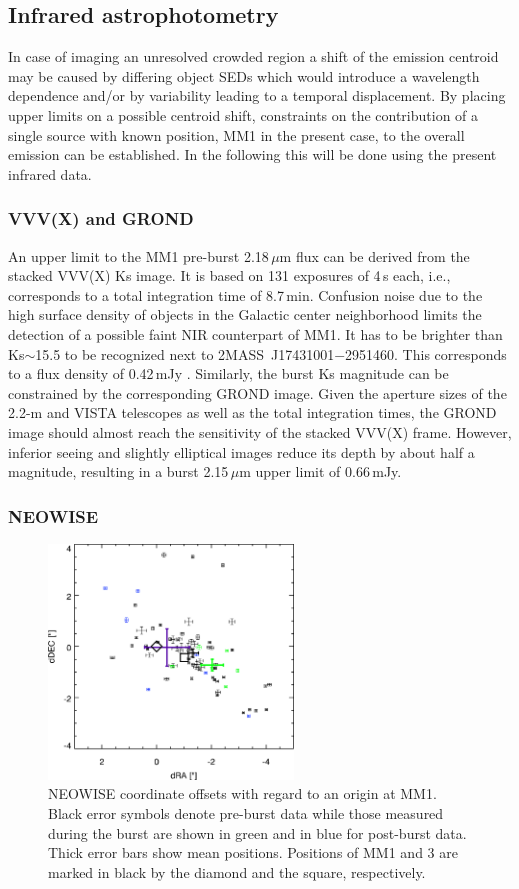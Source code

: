 \documentclass[longauth,usenatbib]{aa}
\begin{document}
\subsection{Infrared astrophotometry}\label{iras}
In case of imaging an unresolved crowded region a shift of the emission centroid may be caused by differing object SEDs which would introduce a wavelength dependence and/or by variability leading to a temporal displacement. By placing upper limits on a possible centroid shift, constraints on the contribution of a single source with known position, MM1 in the present case, to the overall emission can be established. In the following this will be done using %
the present infrared data.

\subsubsection{VVV(X) and GROND}\label{vg}
An upper limit to the MM1 pre-burst 2.18\,$\mu$m flux can be derived from the stacked VVV(X) Ks image. It is based on 131 exposures of 4\,s each, i.e., corresponds to a total integration time of 8.7\,min. Confusion noise due to the high surface density of objects in the Galactic center neighborhood limits the detection of a possible faint NIR counterpart of MM1. It has to be brighter than Ks$\sim$15.5 to be recognized next to 2MASS~J17431001$-$2951460. This corresponds to a flux density of 0.42\,mJy . Similarly, the burst Ks magnitude can be constrained by the corresponding GROND image. Given the aperture sizes of the 2.2-m and VISTA telescopes as well as the total integration times, the GROND image should almost reach the sensitivity of the stacked VVV(X) frame. However, inferior seeing and slightly elliptical images reduce its depth by about half a magnitude, resulting in a burst 2.15\,$\mu$m upper limit of 0.66\,mJy.

\subsubsection{NEOWISE}\label{nw}

\begin{figure}
    \centering
	\includegraphics[width=6.5cm]{G358_dRA_dDEC.png}
	\caption{NEOWISE coordinate offsets with regard to an origin at MM1. Black error symbols denote pre-burst data while those measured during the burst are shown in green and in blue for post-burst data. Thick error bars show mean positions. Positions of MM1 and 3 are marked in black by the diamond and the square, respectively.
	}
 \label{fig:NW_pos}
\end{figure}
\end{document}
